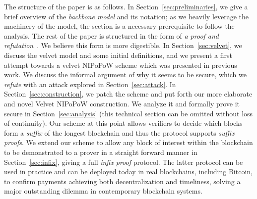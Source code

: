 The structure of the paper is as follows. In Section~\ref{sec:preliminaries}, we
give a brief overview of the \emph{backbone model} and its notation; as we
heavily leverage the machinery of the model, the section is a necessary
prerequisite to follow the analysis. The rest of the paper is structured in the
form of \emph{a proof and refutation}~\cite{lakatos}. We believe this form is
more digestible. In Section~\ref{sec:velvet}, we discuss the velvet model and
some initial definitions, and we present a first attempt towards a velvet
NIPoPoW scheme which was presented in previous work. We discuss the informal
argument of why it seems to be secure, which we \emph{refute} with an attack explored
in Section~\ref{sec:attack}. In Section~\ref{sec:construction}, we patch the
scheme and put forth our more elaborate and novel Velvet NIPoPoW construction.
We analyze it and formally prove it secure in Section~\ref{sec:analysis} (this
technical section can be omitted without loss of continuity). Our scheme at this
point allows verifiers to decide which blocks form a \emph{suffix} of the
longest blockchain and thus the protocol supports \emph{suffix proofs}. We
extend our scheme to allow any block of interest within the blockchain to be
demonstrated to a prover in a straight forward manner in
Section~\ref{sec:infix}, giving a full \emph{infix proof} protocol. The latter
protocol can be used in practice and can be deployed today in real blockchains,
including Bitcoin, to confirm payments achieving both decentralization and
timeliness, solving a major outstanding dilemma in contemporary blockchain
systems.

